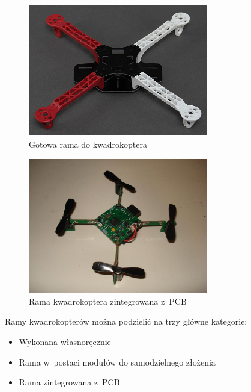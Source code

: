 \documentclass[11pt, twoside]{Thesis} %
\begin{document}
\begin{figure}[H]
	\centering
		\includegraphics[width=0.7\textwidth]{Pictures/quadrotor_frame.jpg}
	\caption[Gotowa rama do kwadrokoptera]{Gotowa rama do kwadrokoptera~\cite{quadro21}}
	\label{fig:quadrotor_frame.jpg}
\end{figure}

\begin{figure}[H]
	\centering
		\includegraphics[width=0.7\textwidth]{Pictures/picocopter.jpg}
	\caption[Rama kwadrokoptera zintegrowana z~PCB]{Rama kwadrokoptera zintegrowana z~PCB~\cite{quadro22}}
	\label{fig:picocopter.jpg}
\end{figure}


Ramy kwadrokopterów można podzielić na trzy główne kategorie:

\begin{itemize}
	\item Wykonana własnoręcznie
	\item Rama w~postaci modułów do samodzielnego złożenia
	\item Rama zintegrowana z~PCB
\end{itemize}
\end{document}
